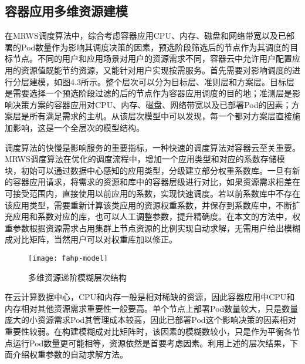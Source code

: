 \subsection{容器应用多维资源建模}
在MRWS调度算法中，综合考虑容器应用CPU、内存、磁盘和网络带宽以及已部署的Pod数量作为影响其调度决策的因素，预选阶段筛选后的节点作为其调度的目标节点。不同的用户和应用场景对用户的资源需求不同，容器云中允许用户配置应用的资源值既能节约资源，又能针对用户实现按需服务。首先需要对影响调度的进行分层建模，如图4.3所示。整个层次可以分为目标层、准则层和方案层。目标层是需要选择一个预选阶段过滤的后的节点作为容器应用调度的目的地；准测层是影响决策方案的容器应用对CPU、内存、磁盘、网络带宽以及已部署Pod的因素；方案层是所有满足需求的主机。从该层次模型中可以发现，每一个都对方案层直接施加影响，这是一个全层次的模型结构。

调度算法的快慢是影响服务的重要指标，一种快速的调度算法对容器云至关重要。MRWS调度算法在优化的调度流程中，增加一个应用类型和对应的系数存储模块，初始可以通过数据中心感知的应用类型，分级建立部分权重系数库。一旦有新的容器应用请求，将需求的资源和库中的容器层级进行对比，如果资源需求相差在可接受范围内，直接使用以前应用的系数，实现快速调度。若以前系数库中不存在该应用类型，需要重新计算该类应用的资源权重系数，并保存到系数库中，不断扩充应用和系数对应的库，也可以人工调整参数，提升精确度。在本文的方法中，权重参数根据资源需求占用集群上节点资源的比例实现自动求解，无需用户给出模糊成对比矩阵，当然用户可以对权重库加以修正。
\begin{figure}[H] %
	\centering
	\texttt{[image: fahp-model]}
	\caption{多维资源递阶模糊层次结构}
\end{figure}
在云计算数据中心，CPU和内存一般是相对稀缺的资源，因此容器应用中CPU和内存相对其他资源需求重要性一般要高。单个节点上部署Pod数量较大，只是数量庞大的小资源需求Pod其管理成本较高，因此已部署Pod这个影响决策的因素相对重要性较弱。在构建模糊成对比矩阵时，该因素的模糊数较小，只是作为平衡各节点运行Pod数量更可能相等，资源依然是首要考虑因素。利用上述的层次结果，下面介绍权重参数的自动求解方法。

